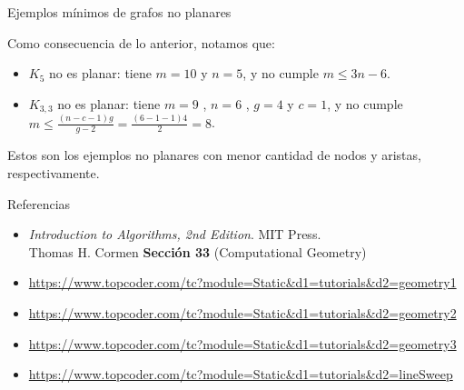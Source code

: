 \documentclass[compress]{beamer}
\begin{document}
\begin{frame}{Ejemplos mínimos de grafos no planares}

Como consecuencia de lo anterior, notamos que:

\begin{itemize}
    \item $K_5$ no es planar: tiene $m=10$ y $n=5$, y no cumple $m \leq 3n-6$.
    \item $K_{3,3}$ no es planar: tiene $m=9$ , $n=6$ , $g=4$ y $c=1$, y no cumple $m \leq \frac{(n-c-1)g}{g-2} = \frac{(6-1-1)4}{2} = 8$.
\end{itemize}

Estos son los ejemplos no planares con menor cantidad de nodos y aristas, respectivamente.

\end{frame}

\begin{frame}{Referencias}
   \begin{itemize}
   \item \textit{Introduction to Algorithms, 2nd Edition}. MIT Press. \\ Thomas H. Cormen
   \textbf{Sección 33} (Computational Geometry)
   \item \url{https://www.topcoder.com/tc?module=Static&d1=tutorials&d2=geometry1}
   \item \url{https://www.topcoder.com/tc?module=Static&d1=tutorials&d2=geometry2}
   \item \url{https://www.topcoder.com/tc?module=Static&d1=tutorials&d2=geometry3}
   \item \url{https://www.topcoder.com/tc?module=Static&d1=tutorials&d2=lineSweep}
  \end{itemize}
  
\end{frame}
\end{document}
